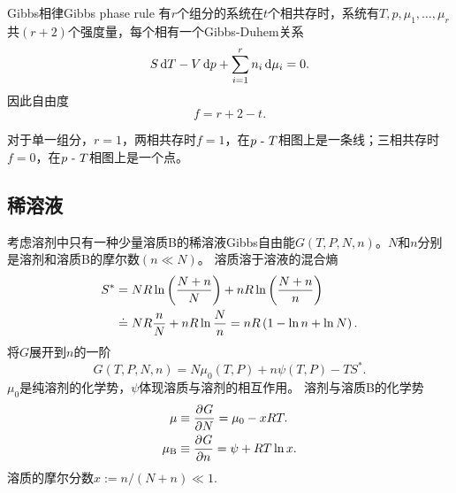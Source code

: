 \begin{theorem}
	{Gibbs相律}{Gibbs phase rule}
	有$r$个组分的系统在$t$个相共存时，系统有$T,p,\mu_1,\ldots,\mu_r$共$(r+2)$个强度量，每个相有一个Gibbs-Duhem关系
	\[
		S\mathop{}\!\mathrm{d} T-V\mathop{}\!\mathrm{d} p+\sum_{i=1}^rn_i\mathop{}\!\mathrm{d}\mu_i=0.
	\]
	因此自由度
	\begin{equation}
		f=r+2-t.
	\end{equation}
\end{theorem}

\begin{corollary}
	对于单一组分，$r=1$，两相共存时$f=1$，在$p~\text{-}~ T$相图上是一条线；三相共存时$f=0$，在$p~\text{-}~ T$相图上是一个点。
\end{corollary}

\subsection{稀溶液}

考虑溶剂中只有一种少量溶质B的稀溶液Gibbs自由能$G(T,P,N,n)$。$N$和$n$分别是溶剂和溶质B的摩尔数$(n\ll N)$。%
溶质溶于溶液的混合熵
\begin{align*}
	S^* & =NR\ln\left(\frac{N+n}N\right)+nR\ln\left(\frac{N+n}n\right)          \\
	    & \doteq NR\frac nN+nR\ln\frac Nn=nR\left(1-\ln n+\ln N\right).
\end{align*}
将$G$展开到$n$的一阶
\[G(T,P,N,n)=N\mu_0(T,P)+n\psi(T,P)-TS^*.\]
$\mu_0$是纯溶剂的化学势，$\psi$体现溶质与溶剂的相互作用。
  溶剂与溶质B的化学势%
\begin{align}\label{solmu}
	\mu         & \equiv\frac{\partial^{{}}G}{\partial{N}^{{}}}=\mu_0-xRT.    \\\notag
	\mu_{\rm B} & \equiv\frac{\partial^{{}}G}{\partial{n}^{{}}}=\psi+RT\ln x.
\end{align}
溶质的摩尔分数$x:=n/(N + n)\ll 1$.
